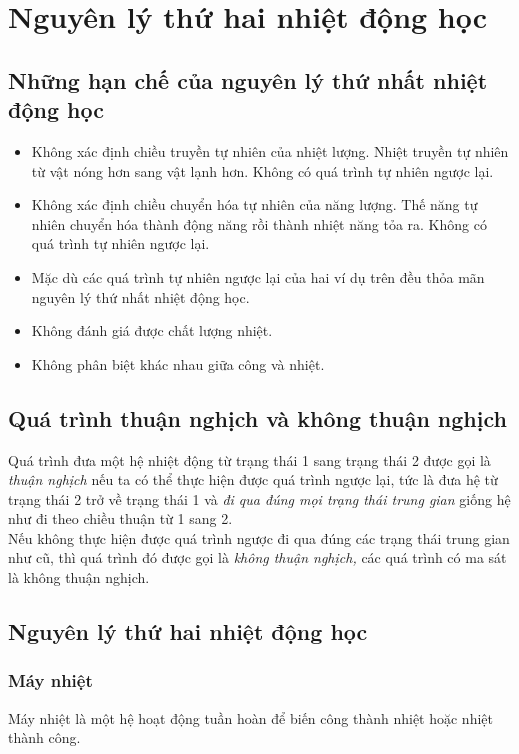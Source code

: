 \chapter{Nguyên lý thứ hai nhiệt động học}
\section{Những hạn chế của nguyên lý thứ nhất nhiệt động học}
\begin{itemize}
\item Không xác định chiều truyền tự nhiên của nhiệt lượng. Nhiệt truyền tự nhiên từ vật nóng hơn sang vật lạnh hơn. Không có quá trình tự nhiên ngược lại.
\item Không xác định chiều chuyển hóa tự nhiên của năng lượng. Thế năng tự nhiên chuyển hóa thành động năng rồi thành nhiệt năng tỏa ra. Không có quá trình tự nhiên ngược lại.
\item Mặc dù các quá trình tự nhiên ngược lại của hai ví dụ trên đều thỏa mãn nguyên lý thứ nhất nhiệt động học.
\item Không đánh giá được chất lượng nhiệt.
\item Không phân biệt khác nhau giữa công và nhiệt.
\end{itemize}
\section{Quá trình thuận nghịch và không thuận nghịch}
Quá trình đưa một hệ nhiệt động từ trạng thái 1 sang trạng thái 2 được gọi là \textit{thuận nghịch} nếu ta có thể thực hiện được quá trình ngược lại, tức là đưa hệ từ trạng thái 2 trở về trạng thái 1 và \textit{đi qua đúng mọi trạng thái trung gian} giống hệ như đi theo chiều thuận từ 1 sang 2.\\
Nếu không thực hiện được quá trình ngược đi qua đúng các trạng thái trung gian như cũ, thì quá trình đó được gọi là \textit{không thuận nghịch,} các quá trình có ma sát là không thuận nghịch.
\section{Nguyên lý thứ hai nhiệt động học}
\subsection{Máy nhiệt}
Máy nhiệt là một hệ hoạt động tuần hoàn để biến công thành nhiệt hoặc nhiệt thành công.
